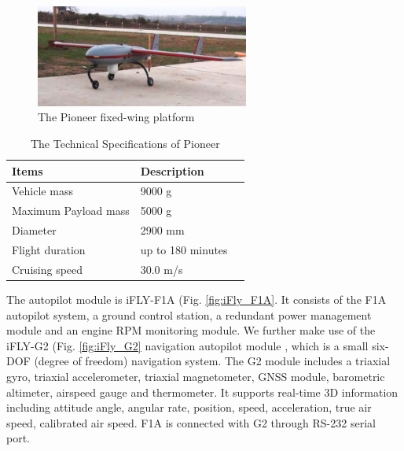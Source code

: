\begin{figure}[!tb]
	\centering
	\includegraphics[width=7cm]{Figs/Kaituozhe_Our.pdf}
	\caption{The Pioneer fixed-wing platform}
	\label{fig:Kaitudozhe_VIGA}    
\end{figure}


\begin{table}
	\caption{The Technical Specifications of Pioneer}
	\label{tab:platform_specifications}
	\begin{center}
		\renewcommand{\arraystretch}{1.1}
		\begin{tabular}{lll}
			\hline
			\textbf {Items}  & \textbf{Description} \\
			\hline
			Vehicle mass & 9000 g \\
			Maximum Payload mass & 5000 g \\
			Diameter & 2900 mm \\
			Flight duration & up to 180 minutes \\
			Cruising speed & 30.0 m/s \\
			\hline
		\end{tabular}
	\end{center}
\end{table}


The autopilot module is iFLY-F1A (Fig. \ref{fig:iFly_F1A}. It consists of the F1A autopilot system, a ground control station, a redundant power management module and an engine RPM monitoring module. We further make use of the iFLY-G2 (Fig. \ref{fig:iFly_G2} navigation autopilot module \cite{IFLY}, which is a small six-DOF (degree of freedom) navigation system. The G2 module includes a triaxial gyro, triaxial accelerometer, triaxial magnetometer, GNSS module, barometric altimeter, airspeed gauge and thermometer. It supports real-time 3D information including attitude angle, angular rate, position, speed, acceleration, true air speed, calibrated air speed. F1A is connected with G2 through RS-232 serial port.

